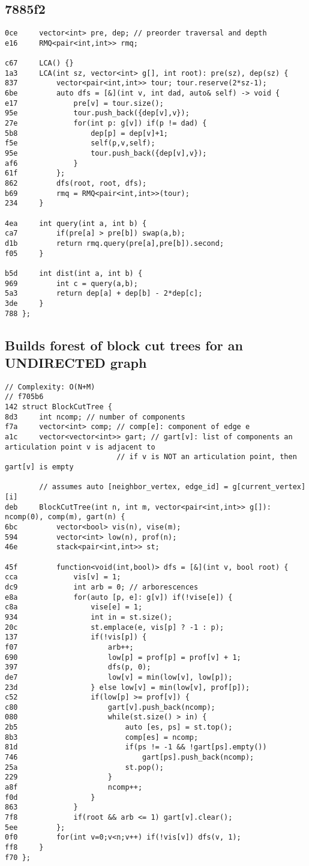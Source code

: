 \documentclass[11pt, a4paper, twoside]{article}
\begin{document}
\subsection{7885f2}
\begin{lstlisting}
0ce 	vector<int> pre, dep; // preorder traversal and depth
e16 	RMQ<pair<int,int>> rmq;

c67 	LCA() {}
1a3 	LCA(int sz, vector<int> g[], int root): pre(sz), dep(sz) {
837 		vector<pair<int,int>> tour; tour.reserve(2*sz-1);
6be 		auto dfs = [&](int v, int dad, auto& self) -> void {
e17 			pre[v] = tour.size();
95e 			tour.push_back({dep[v],v});
27e 			for(int p: g[v]) if(p != dad) {
5b8 				dep[p] = dep[v]+1;
f5e 				self(p,v,self);
95e 				tour.push_back({dep[v],v});
af6 			}
61f 		};
862 		dfs(root, root, dfs);
b69 		rmq = RMQ<pair<int,int>>(tour);
234 	}

4ea 	int query(int a, int b) {
ca7 		if(pre[a] > pre[b]) swap(a,b);
d1b 		return rmq.query(pre[a],pre[b]).second;
f05 	}

b5d 	int dist(int a, int b) {
969 		int c = query(a,b);
5a3 		return dep[a] + dep[b] - 2*dep[c];
3de 	}
788 };
\end{lstlisting}

\subsection{Builds forest of block cut trees for an UNDIRECTED graph}
\begin{lstlisting}
// Complexity: O(N+M)
// f705b6
142 struct BlockCutTree {
8d3 	int ncomp; // number of components
f7a 	vector<int> comp; // comp[e]: component of edge e
a1c 	vector<vector<int>> gart; // gart[v]: list of components an articulation point v is adjacent to
    			          // if v is NOT an articulation point, then gart[v] is empty
    				
    	// assumes auto [neighbor_vertex, edge_id] = g[current_vertex][i]
deb 	BlockCutTree(int n, int m, vector<pair<int,int>> g[]): ncomp(0), comp(m), gart(n) {
6bc 		vector<bool> vis(n), vise(m);
594 		vector<int> low(n), prof(n);
46e 		stack<pair<int,int>> st;
    
45f 		function<void(int,bool)> dfs = [&](int v, bool root) {
cca 			vis[v] = 1;
dc9 			int arb = 0; // arborescences
e8a 			for(auto [p, e]: g[v]) if(!vise[e]) {
c8a 				vise[e] = 1;
934 				int in = st.size();
20c 				st.emplace(e, vis[p] ? -1 : p);
137 				if(!vis[p]) {
f07 					arb++;
690 					low[p] = prof[p] = prof[v] + 1;
397 					dfs(p, 0);
de7 					low[v] = min(low[v], low[p]);
23d 				} else low[v] = min(low[v], prof[p]);
c52 				if(low[p] >= prof[v]) {
c80 					gart[v].push_back(ncomp);
080 					while(st.size() > in) {
2b5 						auto [es, ps] = st.top();
8b3 						comp[es] = ncomp;
81d 						if(ps != -1 && !gart[ps].empty())
746 							gart[ps].push_back(ncomp);
25a 						st.pop();
229 					}
a8f 					ncomp++;
f0d 				}
863 			}
7f8 			if(root && arb <= 1) gart[v].clear();
5ee 		};
0f0 		for(int v=0;v<n;v++) if(!vis[v]) dfs(v, 1);
ff8 	}
f70 };
\end{lstlisting}
\end{document}
